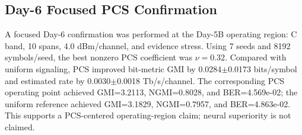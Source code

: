 \subsection{Day-6 Focused PCS Confirmation}
A focused Day-6 confirmation was performed at the Day-5B operating region: C band, 10 spans, 4.0 dBm/channel, and evidence stress. Using 7 seeds and 8192 symbols/seed, the best nonzero PCS coefficient was $\nu=0.32$. Compared with uniform signaling, PCS improved bit-metric GMI by 0.0284$\pm$0.0173 bits/symbol and estimated rate by 0.0030$\pm$0.0018 Tb/s/channel. The corresponding PCS operating point achieved GMI=3.2113, NGMI=0.8028, and BER=4.569e-02; the uniform reference achieved GMI=3.1829, NGMI=0.7957, and BER=4.863e-02. This supports a PCS-centered operating-region claim; neural superiority is not claimed.

